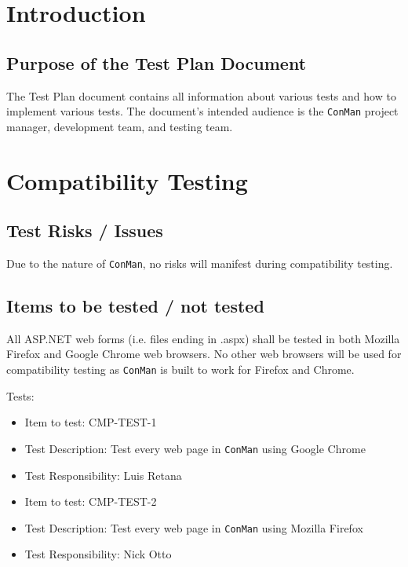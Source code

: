 \documentclass{article}
\begin{document}

\normalsize

\newpage
\tableofcontents

\newpage

\section{Introduction}
\subsection{Purpose of the Test Plan Document}
The Test Plan document contains all information about various tests and 
how to implement various tests. The document's intended audience is the 
\texttt{ConMan} project manager, development team, and testing team.

\newpage
\section{Compatibility Testing}
\subsection{Test Risks / Issues}
Due to the nature of \texttt{ConMan}, no risks will manifest during compatibility 
testing. 

\subsection{Items to be tested / not tested}
All ASP.NET web forms (i.e. files ending in .aspx) shall be tested in both 
Mozilla Firefox and Google Chrome web browsers. No other web browsers will 
be used for compatibility testing as \texttt{ConMan} is built to work for Firefox 
and Chrome.\newline

Tests:
\begin{itemize}
\item Item to test: CMP-TEST-1
\item Test Description: Test every web page in \texttt{ConMan} using Google Chrome
\item Test Responsibility: Luis Retana
\end{itemize}
\begin{itemize}
\item Item to test: CMP-TEST-2
\item Test Description: Test every web page in \texttt{ConMan} using Mozilla Firefox
\item Test Responsibility: Nick Otto
\end{itemize}
\end{document}
